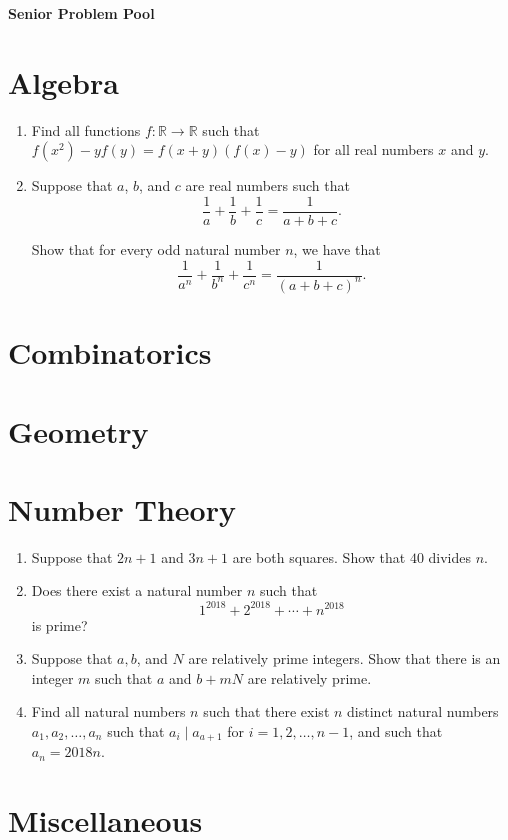 \documentclass{article}
\begin{document}
\begin{center}
\textbf{\huge Senior Problem Pool}
\end{center}

\section*{Algebra}

\begin{enumerate}[1.]

\item %
Find all functions $f : \mathbb{R} \to \mathbb{R}$ such that $f(x^2) - yf(y) = f(x + y) (f(x) - y)$ for all real numbers $x$ and $y$.


\item %

Suppose that $a$, $b$, and $c$ are real numbers such that
\[
	\frac{1}{a} + \frac{1}{b} + \frac{1}{c} = \frac{1}{a + b + c}.
\]

Show that for every odd natural number $n$, we have that
\[
	\frac{1}{a^n} + \frac{1}{b^n} + \frac{1}{c^n} = \frac{1}{{(a + b + c)}^n}.
\]

\end{enumerate}

\section*{Combinatorics}

\section*{Geometry}

\section*{Number Theory}

\begin{enumerate}[1.]

\item %
Suppose that $2n + 1$ and $3n + 1$ are both squares. Show that $40$ divides $n$.


\item %
Does there exist a natural number $n$ such that
\[
	1^{2018} + 2^{2018} + \cdots + n^{2018}
\]
is prime?


\item %
Suppose that $a, b$, and $N$ are relatively prime integers. Show that there is an integer $m$ such that $a$ and $b + mN$ are relatively prime.


\item %
Find all natural numbers $n$ such that there exist $n$ distinct natural numbers $a_1, a_2, \dots, a_n$ such that $a_{i} \mid a_{a + 1}$ for $i = 1, 2, \dots, n-1$, and such that $a_n = 2018 n$.


\end{enumerate}

\section*{Miscellaneous}
\end{document}
